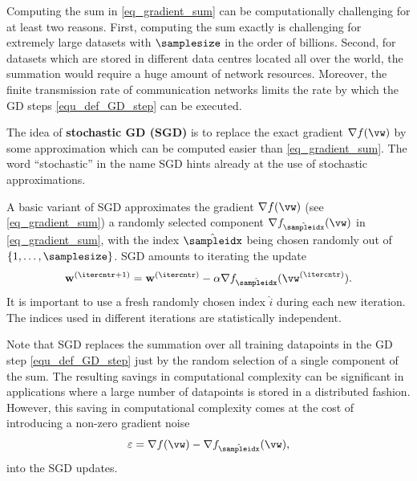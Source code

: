 \documentclass[12pt]{report}
\begin{document}
Computing the sum in \eqref{eq_gradient_sum} can be computationally challenging for at least 
two reasons. First, computing the sum exactly is challenging for extremely large datasets with 
$\samplesize$ in the order of billions. Second, for datasets which are stored in different data 
centres located all over the world, the summation would require a huge amount of 
network resources. Moreover, the finite transmission rate of communication networks 
limits the rate by which the GD steps \eqref{equ_def_GD_step} can be executed. 
\begin{center}
\end{center}


The idea of {\bf stochastic GD (SGD)} is to replace the exact gradient $\nabla f(\vw)$ 
by some approximation which can be computed easier than \eqref{eq_gradient_sum}. 
The word ``stochastic'' in the name SGD hints already at the use of stochastic approximations. 

A basic variant of SGD approximates the gradient $\nabla f(\vw)$ (see \eqref{eq_gradient_sum}) 
a randomly selected component $\nabla f_{\hat{\sampleidx}}(\vw)$ in \eqref{eq_gradient_sum}, 
with the index $\hat{\sampleidx}$ being chosen randomly out of $\{1,\ldots,\samplesize\}$. SGD 
amounts to iterating the update 
\begin{equation}
\label{equ_SGD_update}
\mathbf{w}^{(\itercntr+1)} = \mathbf{w}^{(\itercntr)} - \alpha \nabla f_{\hat{\sampleidx}}(\vw^{(\itercntr)}).
\end{equation} 
It is important to use a fresh randomly chosen index $\hat{i}$ during each new iteration. 
The indices used in different iterations are statistically independent. 

Note that SGD replaces the summation over all training datapoints in the GD step 
\eqref{equ_def_GD_step} just by the random selection of a single component of the sum. 
The resulting savings in computational complexity can be significant in applications 
where a large number of  datapoints is stored in a distributed fashion. However, this 
saving in computational complexity comes at the cost of introducing a non-zero 
gradient noise 
\begin{equation}
\label{equ_gradient_noise}
\varepsilon = \nabla f(\vw)  - \nabla f_{\hat{\sampleidx}}(\vw), 
\end{equation} 
into the SGD updates. 
\end{document}
